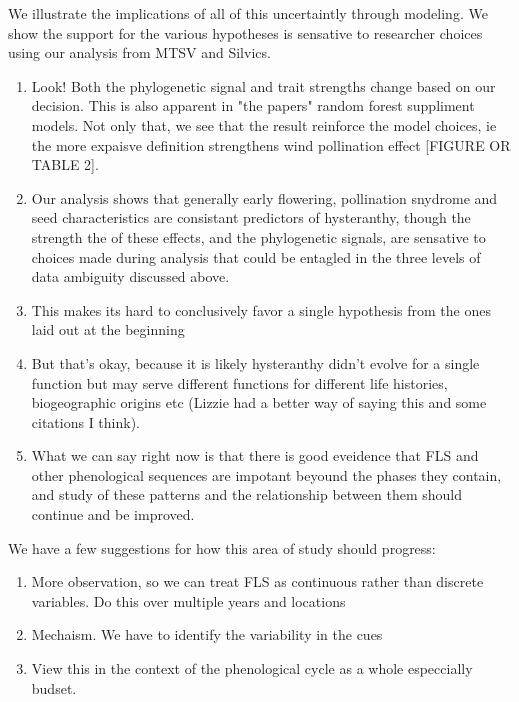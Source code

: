 \documentclass{article}
\begin{document}
\begin{enumerate}
\begin{enumerate}
\begin{enumerate}
\end{enumerate}
\item We illustrate the implications of all of this uncertaintly through modeling. We show the support for the various hypotheses is sensative to researcher choices using our analysis from MTSV and Silvics.
\begin{enumerate}
\item Look! Both the phylogenetic signal and trait strengths change based on our decision. This is also apparent in "the papers" random forest suppliment models. Not only that, we see that the result reinforce the model choices, ie the more expaisve definition strengthens wind pollination effect [FIGURE OR TABLE 2].
\item Our analysis shows that generally early flowering, pollination snydrome and seed characteristics are consistant predictors of hysteranthy, though the strength the of these effects, and the phylogenetic signals, are sensative to choices made during analysis that could be entagled in the three levels of data ambiguity discussed above. 
\item This makes its hard to conclusively favor a single hypothesis from the ones laid out at the beginning
\item But that's okay, because it is likely hysteranthy didn't evolve for a single function but may serve different functions for different life histories, biogeographic origins etc (Lizzie had a better way of saying this and some citations I think).
\item What we can say right now is that there is good eveidence that FLS and other phenological sequences are impotant beyound the phases they contain, and study of these patterns and the relationship between them should continue and be improved.
\end{enumerate}
\item We have a few suggestions for how this area of study should progress:
\begin{enumerate}
\item More observation, so we can treat FLS as continuous rather than discrete variables. Do this over multiple years and locations
\item Mechaism. We have to identify the variability in the cues
\item View this in the context of the phenological cycle as a whole especcially  budset.
\end{enumerate}
\end{document}
